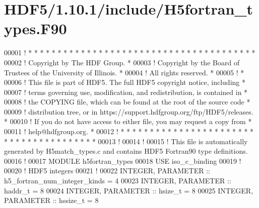 \hypertarget{_h_d_f5_21_810_81_2include_2_h5fortran__types_8_f90_source}{}\section{H\+D\+F5/1.10.1/include/\+H5fortran\+\_\+types.F90}
\label{_h_d_f5_21_810_81_2include_2_h5fortran__types_8_f90_source}

\begin{DoxyCode}
00001 \textcolor{comment}{! * * * * * * * * * * * * * * * * * * * * * * * * * * * * * * * * * * * * * * * }
00002 \textcolor{comment}{!   Copyright by The HDF Group.                                               *}
00003 \textcolor{comment}{!   Copyright by the Board of Trustees of the University of Illinois.         *}
00004 \textcolor{comment}{!   All rights reserved.                                                      *}
00005 \textcolor{comment}{!                                                                             *}
00006 \textcolor{comment}{!   This file is part of HDF5.  The full HDF5 copyright notice, including     *}
00007 \textcolor{comment}{!   terms governing use, modification, and redistribution, is contained in    *}
00008 \textcolor{comment}{!   the COPYING file, which can be found at the root of the source code       *}
00009 \textcolor{comment}{!   distribution tree, or in https://support.hdfgroup.org/ftp/HDF5/releases.  *}
00010 \textcolor{comment}{!   If you do not have access to either file, you may request a copy from     *}
00011 \textcolor{comment}{!   help@hdfgroup.org.                                                        *}
00012 \textcolor{comment}{! * * * * * * * * * * * * * * * * * * * * * * * * * * * * * * * * * * * * * * *}
00013 \textcolor{comment}{!}
00014 \textcolor{comment}{!}
00015 \textcolor{comment}{! This file is automatically generated by H5match\_types.c and contains HDF5 Fortran90 type definitions.}
00016 \textcolor{comment}{!}
00017        \textcolor{keyword}{MODULE} h5fortran\_types
00018          \textcolor{keywordtype}{USE }iso\_c\_binding
00019          \textcolor{comment}{!}
00020          \textcolor{comment}{!  HDF5 integers}
00021          \textcolor{comment}{!}
00022         \textcolor{keywordtype}{INTEGER}, \textcolor{keywordtype}{PARAMETER} :: h5\_fortran\_num\_integer\_kinds = 4
00023         \textcolor{keywordtype}{INTEGER}, \textcolor{keywordtype}{PARAMETER} :: haddr\_t = 8
00024         \textcolor{keywordtype}{INTEGER}, \textcolor{keywordtype}{PARAMETER} :: hsize\_t = 8
00025         \textcolor{keywordtype}{INTEGER}, \textcolor{keywordtype}{PARAMETER} :: hssize\_t = 8

\end{DoxyCode}
